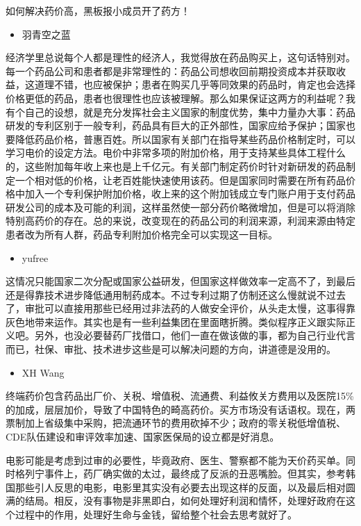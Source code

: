 \documentclass[]{book}
\providecommand{\tightlist}{%
  \setlength{\itemsep}{0pt}\setlength{\parskip}{0pt}}
\begin{document}
如何解决药价高，黑板报小成员开了药方！

\begin{itemize}
\tightlist
\item
  羽青空之蓝
\end{itemize}

经济学里总说每个人都是理性的经济人，我觉得放在药品购买上，这句话特别对。每一个药品公司和患者都是非常理性的：药品公司想收回前期投资成本并获取收益，这道理不错，也应被保护；患者在购买几乎等同效果的药品时，肯定也会选择价格更低的药品，患者也很理性也应该被理解。那么如果保证这两方的利益呢？我有个自己的设想，就是充分发挥社会主义国家的制度优势，集中力量办大事：药品研发的专利区别于一般专利，药品具有巨大的正外部性，国家应给予保护；国家也要降低药品价格，普惠百姓。所以国家有关部门在指导某些药品价格制定时，可以学习电价的设定方法。电价中非常多项的附加价格，用于支持某些具体工程什么的，这些附加每年收上来也是上千亿元。有关部门制定药价时针对新研发的药品制定一个相对低的价格，让老百姓能快速使用该药。但是国家同时需要在所有药品价格中加入一个专利保护附加价格，收上来的这个附加钱成立专门账户用于支付药品研发公司的成本及可能的利润，这样虽然使一部分药价略微增加，但是可以将消除特别高药价的存在。总的来说，改变现在的药品公司的利润来源，利润来源由特定患者改为所有人群，药品专利附加价格完全可以实现这一目标。

\begin{itemize}
\tightlist
\item
  yufree
\end{itemize}

这情况只能国家二次分配或国家公益研发，但国家这样做效率一定高不了，到最后还是得靠技术进步降低通用制药成本。不过专利过期了仿制还这么慢就说不过去了，审批可以直接用那些已经用过非法药的人做安全评价，从头走太慢，这事得靠灰色地带来运作。其实也是有一些利益集团在里面瞎折腾。类似程序正义跟实际正义吧。另外，也没必要替药厂找借口，他们一直在做该做的事，都为自己行业代言而已，社保、审批、技术进步这些是可以解决问题的方向，讲道德是没用的。

\begin{itemize}
\tightlist
\item
  XH Wang
\end{itemize}

终端药价包含药品出厂价、关税、增值税、流通费、利益攸关方费用以及医院15\%的加成，层层加价，导致了中国特色的畸高药价。买方市场没有话语权。现在，两票制加上省级集中采购，把流通环节的费用砍掉不少；政府的零关税低增值税、CDE队伍建设和审评效率加速、国家医保局的设立都是好消息。

电影可能是考虑到过审的必要性，毕竟政府、医生、警察都不能为天价药买单。同时格列宁事件上，药厂确实做的太过，最终成了反派的丑恶嘴脸。但其实，参考韩国那些引人反思的电影，电影里其实没有必要去出现这样的反面，以及最后相对圆满的结局。相反，没有事物是非黑即白，如何处理好利润和情怀，处理好政府在这个过程中的作用，处理好生命与金钱，留给整个社会去思考就好了。
\end{document}
